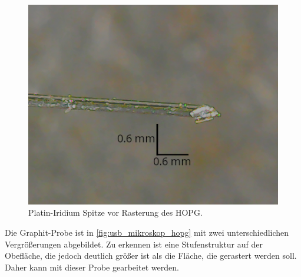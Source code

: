 \begin{figure}[htb]
	\centering
	\includegraphics[width=0.5\linewidth]{figs/spitze_hopg_vorher_v2.png}
	\caption{Platin-Iridium Spitze vor Rasterung des HOPG.}
	\label{fig:spitze_hopg_vorher_v2}
\end{figure}

Die Graphit-Probe ist in \cref{fig:usb_mikroskop_hopg} mit zwei unterschiedlichen
Vergrößerungen abgebildet. Zu erkennen ist eine Stufenstruktur auf der Obefläche, die jedoch
deutlich größer ist als die Fläche, die gerastert werden soll. Daher kann mit dieser
Probe gearbeitet werden.


